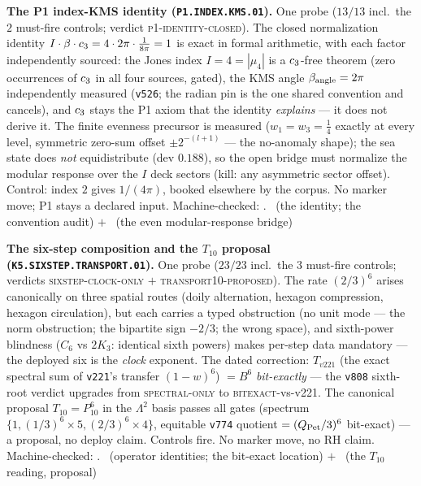 
\par\smallskip\noindent\textbf{The P1 index-KMS identity
(\texttt{P1.INDEX.KMS.01}).}
One probe ($13/13$ incl.\ the $2$ must-fire controls; verdict
\textsc{p1-identity-closed}).  The closed normalization identity
$I\cdot\beta\cdot c_3=4\cdot2\pi\cdot\tfrac1{8\pi}=1$ is exact
in formal arithmetic, with each factor independently sourced: the
Jones index $I=4=|\mu_4|$ is a $c_3$-free theorem (zero
occurrences of $c_3$ in all four sources, gated), the KMS angle
$\beta_{\rm angle}=2\pi$ independently measured (\texttt{v526}; the
radian pin is the one shared convention and cancels), and
$c_3$ stays the P1 axiom that the identity \emph{explains} ---
it does not derive it.  The finite evenness precursor is measured
($w_1=w_3=\tfrac14$ exactly at every level, symmetric zero-sum
offset $\pm2^{-(l+1)}$ --- the no-anomaly shape); the sea state
does \emph{not} equidistribute (dev $0.188$), so the open bridge
must normalize the modular response over the $I$ deck sectors
(kill: any asymmetric sector offset).  Control: index $2$ gives
$1/(4\pi)$, booked elsewhere by the corpus.  No marker move; P1
stays a declared input.
Machine-checked: .
\mE\ (the identity; the convention audit) $+$ \mO\ (the even
modular-response bridge)
\par\smallskip

\par\smallskip\noindent\textbf{The six-step composition and the
$T_{10}$ proposal (\texttt{K5.SIXSTEP.TRANSPORT.01}).}
One probe ($23/23$ incl.\ the $3$ must-fire controls; verdicts
\textsc{sixstep-clock-only} $+$ \textsc{transport10-proposed}).
The rate $(2/3)^6$ arises canonically on three spatial routes
(doily alternation, hexagon compression, hexagon circulation), but
each carries a typed obstruction (no unit mode --- the norm
obstruction; the bipartite sign $-2/3$; the wrong space), and
sixth-power blindness ($C_6$ vs $2K_3$: identical sixth powers)
makes per-step data mandatory --- the deployed six is the
\emph{clock} exponent.  The dated correction: $T_{v221}$ (the
exact spectral sum of \texttt{v221}'s transfer $(1-w)^6$) $=B^6$
\emph{bit-exactly} --- the \texttt{v808} sixth-root verdict
upgrades from \textsc{spectral-only} to \textsc{bitexact}-vs-v221.
The canonical proposal $T_{10}=P_{10}^6$ in the $\Lambda^2$ basis
passes all gates (spectrum $\{1,(1/3)^6{\times}5,
(2/3)^6{\times}4\}$, equitable \texttt{v774} quotient
$=(Q_{\rm Pet}/3)^6$ bit-exact) --- a proposal, no deploy claim.
Controls fire.  No marker move, no RH claim.
Machine-checked: .
\mE\ (operator identities; the bit-exact location) $+$ \mC\
(the $T_{10}$ reading, proposal)
\par\smallskip

